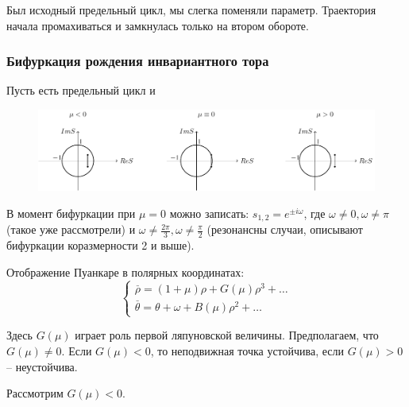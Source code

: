 Был исходный предельный цикл, мы слегка поменяли параметр. Траектория начала промахиваться и замкнулась только на втором обороте. 

\subsubsection{Бифуркация рождения инвариантного тора}
Пусть есть предельный цикл и
\begin{figure}[H]
	\centering
	\includegraphics[width=1\linewidth]{fig/fig71.pdf}   
\end{figure}
В момент бифуркации при $\mu=0$ можно записать: $s_{1,2}=e^{\pm i\omega}$, где $\omega \neq 0,\omega \neq \pi$ (такое уже рассмотрели) и $\omega \neq \frac{2\pi}{3},\omega \neq \frac{\pi}{2}$ (резонансны случаи, описывают бифуркации коразмерности 2 и выше).

Отображение Пуанкаре в полярных координатах:
\begin{equation}
	\left\{\begin{aligned}
		\stackrel{\_}{\rho}= (1+\mu)\rho+G(\mu)\rho^3+\dots \\
		\stackrel{\_}{\theta}= \theta+\omega+B(\mu)\rho^2+\dots
	\end{aligned}\right.
	\label{eq:s9:4}	
\end{equation}

Здесь $G(\mu)$ играет роль первой ляпуновской величины. Предполагаем, что $G(\mu)\neq 0$. Если $G(\mu)< 0$, то неподвижная точка устойчива, если $G(\mu)> 0$ -- неустойчива. 

Рассмотрим $G(\mu)< 0$. 

